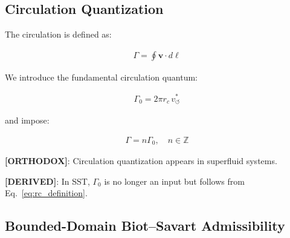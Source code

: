 \documentclass[11pt]{article}
\theoremstyle{definition}
\theoremstyle{plain}
\theoremstyle{remark}
\newcommand{\rc}{{r_c}}
\newcommand{\vchar}{v_{\!\boldsymbol{\circlearrowleft}}^{\ast}}
\begin{document}
    \subsection{Circulation Quantization}
        
        The circulation is defined as:
        
        \begin{align}
            \Gamma = \oint \mathbf{v} \cdot d\ell
        \end{align}
        
        We introduce the fundamental circulation quantum:
        
        \begin{align}
            \Gamma_0 = 2\pi \rc \, \vchar
            \label{eq:gamma0}
        \end{align}
        
        and impose:
        
        \begin{align}
            \Gamma = n \Gamma_0, \quad n \in \mathbb{Z}
        \end{align}
        
        \textbf{[ORTHODOX]}: Circulation quantization appears in superfluid systems.
        
        \textbf{[DERIVED]}: In SST, $\Gamma_0$ is no longer an input but follows from Eq.~\ref{eq:rc_definition}.
    
\subsection{Bounded-Domain Biot--Savart Admissibility}
        \label{subsec:bounded_domain_biot_savart}
\end{document}
